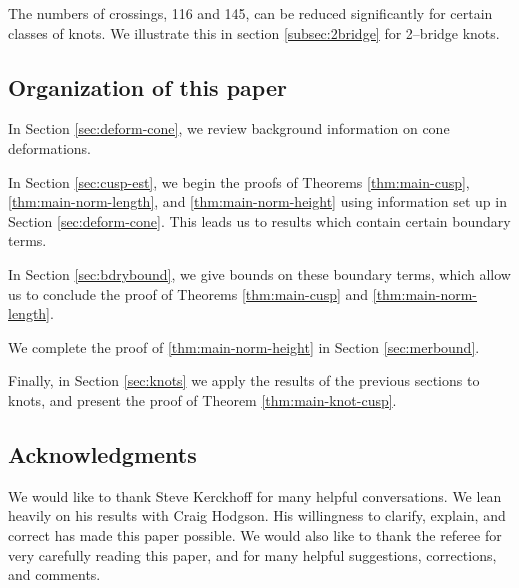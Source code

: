 The numbers of crossings, 116 and 145, can be reduced significantly
for certain classes of knots.  We illustrate this in section
\ref{subsec:2bridge} for 2--bridge knots.


\subsection{Organization of this paper}
\label{sec:organize}

In Section \ref{sec:deform-cone}, we review background information on
cone deformations.

In Section \ref{sec:cusp-est}, we begin the proofs of Theorems
\ref{thm:main-cusp}, \ref{thm:main-norm-length}, and
\ref{thm:main-norm-height} using information set up in Section
\ref{sec:deform-cone}.  This leads us to results which contain certain
boundary terms.

In Section \ref{sec:bdrybound}, we give bounds on these boundary
terms, which allow us to conclude the proof of Theorems
\ref{thm:main-cusp} and \ref{thm:main-norm-length}.

We complete the proof of \ref{thm:main-norm-height} in Section
\ref{sec:merbound}.

Finally, in Section \ref{sec:knots} we apply the results of the
previous sections to knots, and present the proof of Theorem
\ref{thm:main-knot-cusp}.

\subsection{Acknowledgments}

We would like to thank Steve Kerckhoff for many helpful conversations.
We lean heavily on his results with Craig Hodgson.  His willingness to
clarify, explain, and correct has made this paper possible.  We would
also like to thank the referee for very carefully reading this paper,
and for many helpful suggestions, corrections, and comments.



